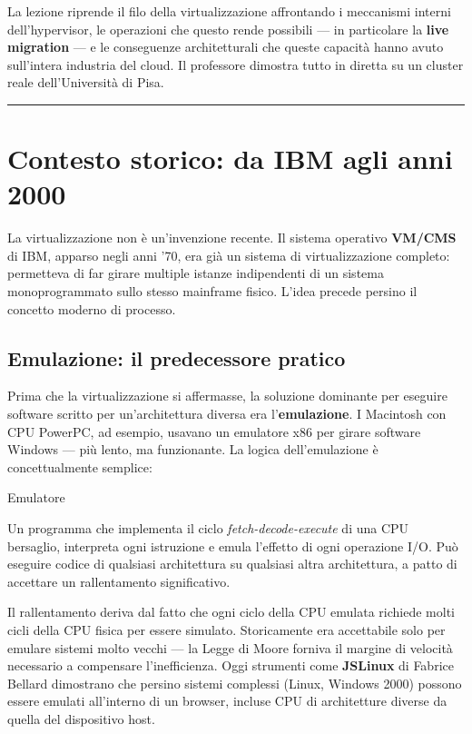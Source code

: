 \documentclass[
  italian,
  openany]{book}
\begin{document}
La lezione riprende il filo della virtualizzazione affrontando i
meccanismi interni dell'hypervisor, le operazioni che questo rende
possibili --- in particolare la \textbf{live migration} --- e le
conseguenze architetturali che queste capacità hanno avuto sull'intera
industria del cloud. Il professore dimostra tutto in diretta su un
cluster reale dell'Università di Pisa.

\begin{center}\rule{0.5\linewidth}{0.5pt}\end{center}

\section{Contesto storico: da IBM agli anni
2000}\label{contesto-storico-da-ibm-agli-anni-2000}

La virtualizzazione non è un'invenzione recente. Il sistema operativo
\textbf{VM/CMS} di IBM, apparso negli anni '70, era già un sistema di
virtualizzazione completo: permetteva di far girare multiple istanze
indipendenti di un sistema monoprogrammato sullo stesso mainframe
fisico. L'idea precede persino il concetto moderno di processo.

\subsection{Emulazione: il predecessore
pratico}\label{emulazione-il-predecessore-pratico}

Prima che la virtualizzazione si affermasse, la soluzione dominante per
eseguire software scritto per un'architettura diversa era
l'\textbf{emulazione}. I Macintosh con CPU PowerPC, ad esempio, usavano
un emulatore x86 per girare software Windows --- più lento, ma
funzionante. La logica dell'emulazione è concettualmente semplice:

\begin{calloutdefinition}{Emulatore}

Un programma che implementa il ciclo \emph{fetch-decode-execute} di una
CPU bersaglio, interpreta ogni istruzione e emula l'effetto di ogni
operazione I/O. Può eseguire codice di qualsiasi architettura su
qualsiasi altra architettura, a patto di accettare un rallentamento
significativo.

\end{calloutdefinition}

Il rallentamento deriva dal fatto che ogni ciclo della CPU emulata
richiede molti cicli della CPU fisica per essere simulato. Storicamente
era accettabile solo per emulare sistemi molto vecchi --- la Legge di
Moore forniva il margine di velocità necessario a compensare
l'inefficienza. Oggi strumenti come \textbf{JSLinux} di Fabrice Bellard
dimostrano che persino sistemi complessi (Linux, Windows 2000) possono
essere emulati all'interno di un browser, incluse CPU di architetture
diverse da quella del dispositivo host.
\end{document}
